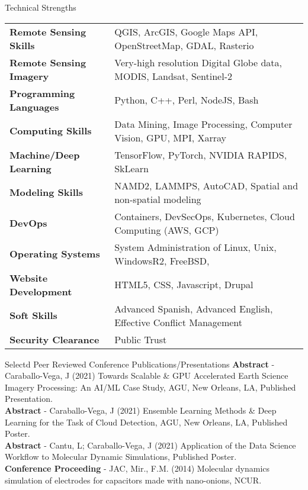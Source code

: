 \documentclass{resume} %
\begin{document}

\begin{rSection}{Technical Strengths}

\begin{tabular}{ @{} >{\bfseries}l @{\hspace{6ex}} l }
Remote Sensing Skills & QGIS, ArcGIS, Google Maps API, OpenStreetMap, GDAL, Rasterio\\
Remote Sensing Imagery & Very-high resolution Digital Globe data, MODIS, Landsat, Sentinel-2\\
Programming Languages & Python, C++, Perl, NodeJS, Bash \\
Computing Skills & Data Mining, Image Processing, Computer Vision, GPU, MPI, Xarray\\
Machine/Deep Learning &  TensorFlow, PyTorch, NVIDIA RAPIDS, SkLearn \\
Modeling Skills & NAMD2, LAMMPS, AutoCAD, Spatial and non-spatial modeling \\
DevOps & Containers, DevSecOps, Kubernetes,  Cloud Computing (AWS, GCP) \\
Operating Systems & System Administration of Linux, Unix, WindowsR2, FreeBSD, \\
Website Development & HTML5, CSS, Javascript, Drupal \\
Soft Skills & Advanced Spanish, Advanced English, Effective Conflict Management \\
Security Clearance & Public Trust
\end{tabular}

\end{rSection}

\begin{rSection}{Selectd Peer Reviewed Conference Publications/Presentations}
\textbf{Abstract} - Caraballo-Vega, J (2021) Towards Scalable \& GPU Accelerated Earth Science Imagery Processing: An AI/ML Case Study,  AGU,  New Orleans, LA, Published Presentation. \\
\textbf{Abstract} - Caraballo-Vega, J (2021) Ensemble Learning Methods \& Deep Learning for the Task of Cloud Detection, AGU, New Orleans, LA, Published Poster. \\
\textbf{Abstract} - Cantu, L; Caraballo-Vega, J (2021) Application of the Data Science Workflow to Molecular Dynamic Simulations, Published Poster. \\
\textbf{Conference Proceeding} - JAC, Mir., F.M. (2014) Molecular dynamics simulation of electrodes for capacitors made with nano-onions, NCUR. \\
\end{rSection}
\end{document}

